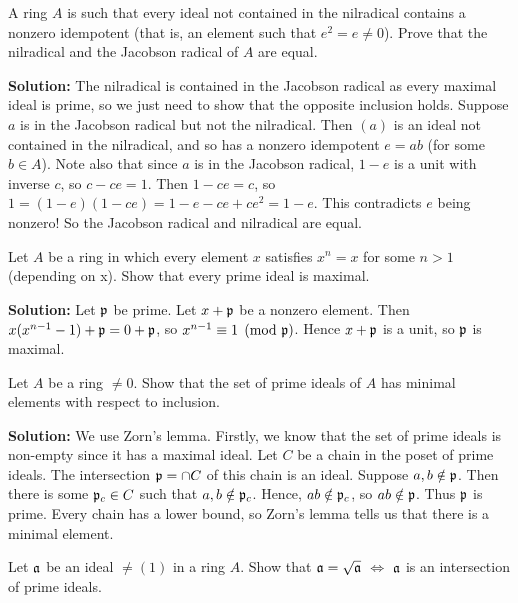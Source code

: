 \documentclass{article}
\begin{document}
\begin{exercise}
    A ring \(A\) is such that every ideal not contained in the nilradical contains a nonzero idempotent (that is, an element such that \(e^2 = e \neq 0\)).
    Prove that the nilradical and the Jacobson radical of \(A\) are equal.
\end{exercise}

\noindent\textbf{Solution:}
The nilradical is contained in the Jacobson radical as every maximal ideal is prime, so we just need to show that the opposite inclusion holds.
Suppose \(a\) is in the Jacobson radical but not the nilradical.
Then \((a)\) is an ideal not contained in the nilradical, and so has a nonzero idempotent \(e = ab\) (for some \(b \in A\)).
Note also that since \(a\) is in the Jacobson radical, \(1 - e\) is a unit with inverse \(c\), so \(c - ce = 1\).
Then \(1 - ce = c\), so \(1 = (1 - e)(1 - ce) = 1 - e - ce + ce^2 = 1 - e\).
This contradicts \(e\) being nonzero!
So the Jacobson radical and nilradical are equal.

\begin{exercise} \label{ex1-7}
    Let \(A\) be a ring in which every element \(x\) satisfies \(x^n = x\) for some \(n > 1\) (depending on x).
    Show that every prime ideal is maximal.
\end{exercise}

\noindent\textbf{Solution:}
Let \(\mathfrak{p}\) be prime.
Let \(x + \mathfrak{p}\) be a nonzero element.
Then \(x (x^{n-1} - 1) + \mathfrak{p} = 0 + \mathfrak{p}\), so \(x^{n-1} \equiv 1 \pmod{\mathfrak{p}}\).
Hence \(x + \mathfrak{p}\) is a unit, so \(\mathfrak{p}\) is maximal.

\begin{exercise} \label{ex1-8}
    Let \(A\) be a ring \(\neq 0\).
    Show that the set of prime ideals of \(A\) has minimal elements with respect to inclusion.
\end{exercise}

\noindent\textbf{Solution:}
We use Zorn's lemma.
Firstly, we know that the set of prime ideals is non-empty since it has a maximal ideal.
Let \(C\) be a chain in the poset of prime ideals.
The intersection \(\mathfrak{p} = \cap C\) of this chain is an ideal.
Suppose \(a, b \notin \mathfrak{p}\).
Then there is some \(\mathfrak{p}_c \in C\) such that \(a, b \notin \mathfrak{p}_c\).
Hence, \(ab \notin \mathfrak{p}_c\), so \(ab \notin \mathfrak{p}\).
Thus \(\mathfrak{p}\) is prime.
Every chain has a lower bound, so Zorn's lemma tells us that there is a minimal element.

\begin{exercise}
    Let \(\mathfrak{a}\) be an ideal \(\neq (1)\) in a ring \(A\).
    Show that \(\mathfrak{a} = \sqrt{\mathfrak{a}}\) \(\iff\) \(\mathfrak{a}\) is an intersection of prime ideals.
\end{exercise}
\end{document}
